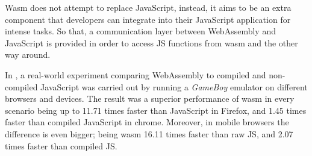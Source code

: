 Wasm does not attempt to replace JavaScript, instead, it aims to be an extra component that developers can integrate into their JavaScript application for intense tasks. So that, a communication layer between WebAssembly and JavaScript is provided in order to access JS functions from wasm and the other way around.

In \cite{wasm-compared}, a real-world experiment comparing WebAssembly to compiled and non-compiled JavaScript was carried out by running a \textit{GameBoy} emulator on different browsers and devices. The result was a superior performance of wasm in every scenario being up to 11.71 times faster than JavaScript in Firefox, and 1.45 times faster than compiled JavaScript in chrome. Moreover, in mobile browsers the difference is even bigger; being wasm 16.11 times faster than raw JS, and 2.07 times faster than compiled JS.




















